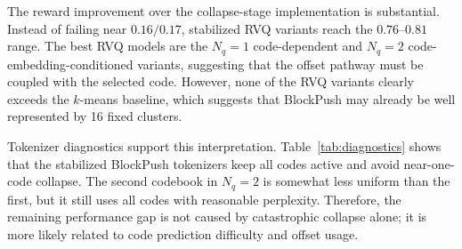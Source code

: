 \documentclass[conference]{IEEEtran}
\begin{document}
\begin{table}[t]
\centering
\caption{BlockPush evaluation results.}
\label{tab:blockpush_results}
\end{table}

The reward improvement over the collapse-stage implementation is substantial. Instead of failing near $0.16/0.17$, stabilized RVQ variants reach the $0.76$--$0.81$ range. The best RVQ models are the $N_q{=}1$ code-dependent and $N_q{=}2$ code-embedding-conditioned variants, suggesting that the offset pathway must be coupled with the selected code. However, none of the RVQ variants clearly exceeds the $k$-means baseline, which suggests that BlockPush may already be well represented by 16 fixed clusters.

Tokenizer diagnostics support this interpretation. Table~\ref{tab:diagnostics} shows that the stabilized BlockPush tokenizers keep all codes active and avoid near-one-code collapse. The second codebook in $N_q{=}2$ is somewhat less uniform than the first, but it still uses all codes with reasonable perplexity. Therefore, the remaining performance gap is not caused by catastrophic collapse alone; it is more likely related to code prediction difficulty and offset usage.

\begin{table}[t]
\centering
\caption{BlockPush tokenizer diagnostics.}
\label{tab:diagnostics}
\end{table}
\end{document}
